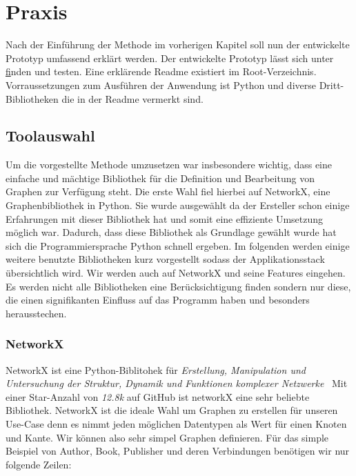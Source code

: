 \chapter{Praxis}

Nach der Einführung der Methode im vorherigen Kapitel soll nun der entwickelte Prototyp umfassend erklärt werden.
Der entwickelte Prototyp lässt sich unter \href{https://github.com/gernhard1337/graphql-primepath-tester} finden und testen.
Eine erklärende Readme existiert im Root-Verzeichnis.
Vorraussetzungen zum Ausführen der Anwendung ist Python und diverse Dritt-Bibliotheken die in der Readme vermerkt sind.

\section{Toolauswahl}
Um die vorgestellte Methode umzusetzen war insbesondere wichtig, dass eine einfache und mächtige Bibliothek für die Definition und Bearbeitung
von Graphen zur Verfügung steht.
Die erste Wahl fiel hierbei auf NetworkX, eine Graphenbibliothek in Python.
Sie wurde ausgewählt da der Ersteller schon einige Erfahrungen mit dieser Bibliothek hat und somit eine effiziente Umsetzung möglich war.
Dadurch, dass diese Bibliothek als Grundlage gewählt wurde hat sich die Programmiersprache Python schnell ergeben.
Im folgenden werden einige weitere benutzte Bibliotheken kurz vorgestellt sodass der Applikationsstack übersichtlich wird.
Wir werden auch auf NetworkX und seine Features eingehen.
Es werden nicht alle Bibliotheken eine Berücksichtigung finden sondern nur diese, die einen signifikanten Einfluss auf das Programm haben und besonders herausstechen.

\subsection{NetworkX}

NetworkX ist eine Python-Biblitohek für \textit{Erstellung, Manipulation und Untersuchung der Struktur, Dynamik und Funktionen komplexer Netzwerke}~\cite[vgl. Startseite]{networkx}
Mit einer Star-Anzahl von \textit{12.8k}\cite{networkxgithub} auf GitHub ist networkX eine sehr beliebte Bibliothek.
NetworkX ist die ideale Wahl um Graphen zu erstellen für unseren Use-Case denn es nimmt jeden möglichen Datentypen als Wert für einen Knoten und Kante.
Wir können also sehr simpel Graphen definieren.
Für das simple Beispiel von Author, Book, Publisher und deren Verbindungen benötigen wir nur folgende Zeilen:

